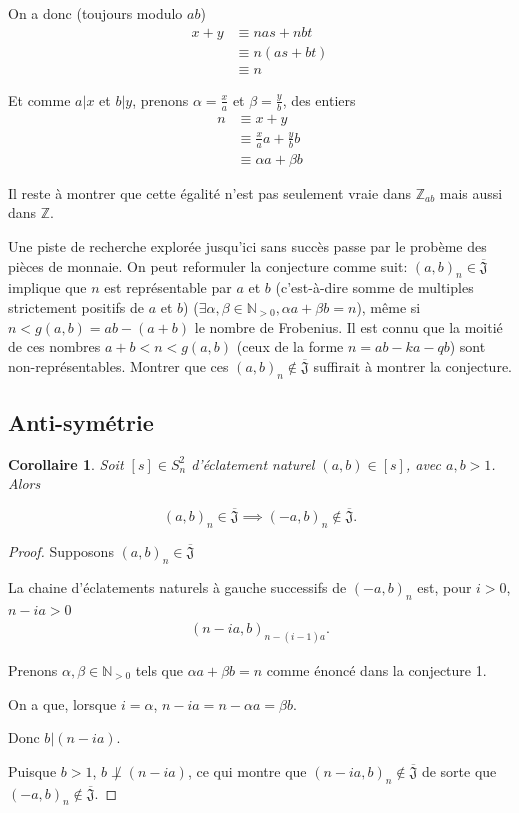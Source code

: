\documentclass{article}
\newtheorem{corollary}{Corollaire}
\newcommand{\J}{\mathfrak{J}}
\newcommand{\JS}{\overline{\J}}
\begin{document}
On a donc (toujours modulo $ab$)
\begin{align*}
    x + y & \equiv nas + nbt \\
            & \equiv n(as + bt) \\
            & \equiv n
\end{align*}

Et comme $a \vert x$ et $b \vert y$, prenons $\alpha = \frac{x}{a}$ et $\beta = \frac{y}{b}$, des entiers
\begin{align*}
    n & \equiv x + y \\
        & \equiv \frac{x}{a}a + \frac{y}{b}b \\
        & \equiv \alpha a + \beta b
\end{align*}

Il reste à montrer que cette égalité n'est pas seulement vraie dans $\mathbb{Z}_{ab}$ mais aussi dans $\mathbb{Z}$.

Une piste de recherche explorée jusqu'ici sans succès passe par le probème des pièces de monnaie. 
On peut reformuler la conjecture comme suit: ${(a, b)}_n \in \JS$ implique que $n$ est représentable 
par $a$ et $b$ (c'est-à-dire somme de multiples strictement positifs de $a$ et $b$) 
($\exists \alpha, \beta \in \mathbb{N}_{>0}, \alpha a + \beta b = n$), même si $n < g(a, b) = ab - (a + b)$ le nombre de Frobenius\cite{sylvester1882}.
Il est connu que la moitié de ces nombres $a + b < n < g(a, b)$ (ceux de la forme $n = ab - ka - qb$) sont non-représentables.
Montrer que ces ${(a, b)}_n \not \in \JS$ suffirait à montrer la conjecture.

\subsection{Anti-symétrie}

\begin{corollary}
    Soit $[s] \in S_n^2$ d'éclatement naturel $(a, b) \in [s]$, avec $a, b > 1$. Alors

    \[ {(a, b)}_n \in \JS \implies {(-a, b)}_n \not \in \JS. \]
\end{corollary}

\begin{proof}
    Supposons ${(a, b)}_n \in \JS$

    La chaine d'éclatements naturels à gauche successifs de ${(-a, b)}_n$ est, pour $i > 0$, $n - ia > 0$
    \begin{align*}
        {(n - ia, b)}_{n-(i-1)a}.
    \end{align*}

    Prenons $\alpha, \beta \in \mathbb{N}_{>0}$ tels que $\alpha a + \beta b = n$ comme énoncé dans la conjecture 1.

    On a que, lorsque $i = \alpha$, $n - ia = n - \alpha a = \beta b$.

    Donc $b \vert (n - ia)$. 
    
    Puisque $b > 1$, $b \not \perp (n - ia)$, ce qui montre que ${(n - ia, b)}_n \not \in \JS$ de sorte que ${(-a, b)}_n \not \in \JS$.
\end{proof}
\end{document}
